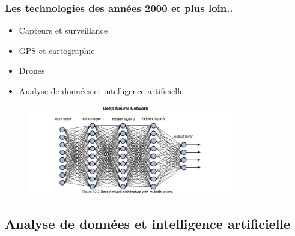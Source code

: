 \documentclass{beamer}
\begin{document}
			\begin{frame}
	\frametitle{Les technologies des années 2000 et plus loin..}
	\begin{itemize}
		\item Capteurs et surveillance
		\item GPS et cartographie
		\item Drones
		\item \alert{Analyse de données et intelligence artificielle}
	\end{itemize}
	
	\begin{figure}
		\includegraphics[width=0.8\textwidth]{neuron}
		\label{fig:example}
	\end{figure}
	
\end{frame}

		
		\subsection{Analyse de données et intelligence artificielle}
\end{document}
